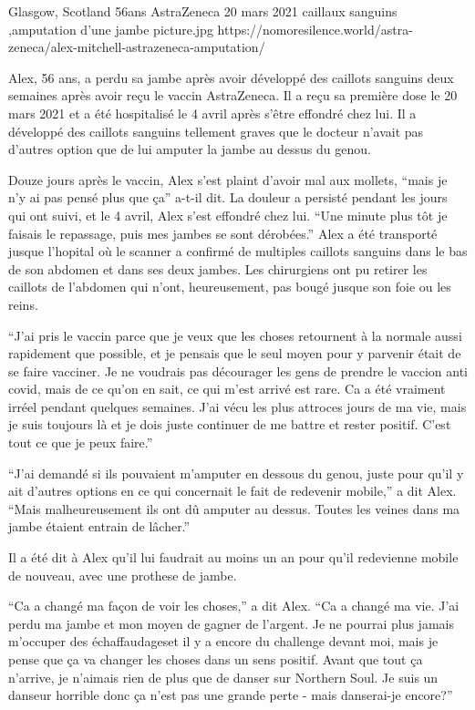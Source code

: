           {Glasgow, Scotland}
          {56ans}
          {AstraZeneca}
          {20 mars 2021}
          {caillaux sanguins
            ,amputation d'une jambe
          }
          {picture.jpg}
          {https://nomoresilence.world/astra-zeneca/alex-mitchell-astrazeneca-amputation/}
          {

Alex, 56 ans, a perdu sa jambe après avoir développé des caillots sanguins deux
semaines après avoir reçu le vaccin AstraZeneca. Il a reçu sa première dose le
20 mars 2021 et a été hospitalisé le 4 avril après s'être effondré chez lui. Il
a développé des caillots sanguins tellement graves que le docteur n'avait pas
d'autres option que de lui amputer la jambe au dessus du genou.

Douze jours après le vaccin, Alex s'est plaint d'avoir mal aux mollets, “mais je
n'y ai pas pensé plus que ça” a-t-il dit. La douleur a persisté pendant les
jours qui ont suivi, et le 4 avril, Alex s'est effondré chez lui. “Une minute
plus tôt je faisais le repassage, puis mes jambes se sont dérobées.” Alex a été
transporté jusque l'hopital où le scanner a confirmé de multiples caillots
sanguins dans le bas de son abdomen et dans ses deux jambes. Les chirurgiens ont
pu retirer les caillots de l'abdomen qui n'ont, heureusement, pas bougé jusque
son foie ou les reins.

“J'ai pris le vaccin parce que je veux que les choses retournent à la normale
aussi rapidement que possible, et je pensais que le seul moyen pour y parvenir
était de se faire vacciner. Je ne voudrais pas décourager les gens de prendre le
vaccion anti covid, mais de ce qu'on en sait, ce qui m'est arrivé est rare. Ca a
été vraiment irréel pendant quelques semaines. J'ai vécu les plus attroces jours
de ma vie, mais je suis toujours là et je dois juste continuer de me battre et
rester positif. C'est tout ce que je peux faire.”

“J'ai demandé si ils pouvaient m'amputer en dessous du genou, juste pour qu'il y
ait d'autres options en ce qui concernait le fait de redevenir mobile,” a dit
Alex. “Mais malheureusement ils ont dû amputer au dessus. Toutes les veines dans
ma jambe étaient entrain de lâcher.”

Il a été dit à Alex qu'il lui faudrait au moins un an pour qu'il redevienne
mobile de nouveau, avec une prothese de jambe.

“Ca a changé ma façon de voir les choses,” a dit Alex. “Ca a changé ma vie. J'ai
perdu ma jambe et mon moyen de gagner de l'argent. Je ne pourrai plus jamais
m'occuper des échaffaudageset il y a encore du challenge devant moi, mais je
pense que ça va changer les choses dans un sens positif. Avant que tout ça
n'arrive, je n'aimais rien de plus que de danser sur Northern Soul. Je suis un
danseur horrible donc ça n'est pas une grande perte - mais danserai-je encore?”

}
